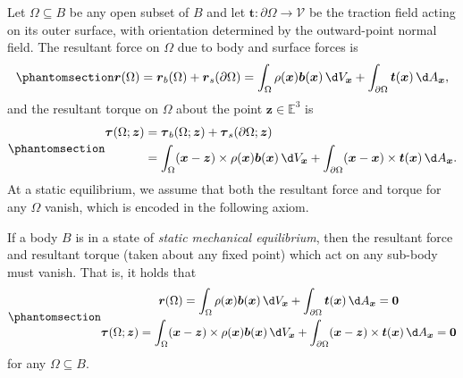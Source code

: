 \documentclass[
  letterpaper,
  DIV=11,
  numbers=noendperiod]{scrreprt}
\theoremstyle{plain}
\theoremstyle{remark}
\begin{document}
Let \(\Omega\subseteq B\) be any open subset of \(B\) and let
\({\boldsymbol{t}}:\partial\Omega\to{\mathcal{V}}\) be the traction
field acting on its outer surface, with orientation determined by the
outward-point normal field. The resultant force on \(\Omega\) due to
body and surface forces is
\begin{equation}\phantomsection\label{eq-resultantforce}{
  {\boldsymbol{r}}(\Omega) = {\boldsymbol{r}}_b(\Omega)+{\boldsymbol{r}}_s(\partial\Omega) = \int_\Omega \rho({\boldsymbol{x}}){\boldsymbol{b}}({\boldsymbol{x}}){\,\d V_{{\boldsymbol{x}}}}+\int_{\partial\Omega}{\boldsymbol{t}}({\boldsymbol{x}}){\,\d A_{{\boldsymbol{x}}}},}\end{equation}
and the resultant torque on \(\Omega\) about the point
\({\boldsymbol{z}}\in{\mathbb{E}}^3\) is
\begin{equation}\phantomsection\label{eq-resultanttorque}{
  \begin{aligned}
    {\boldsymbol{\tau}}(\Omega;{\boldsymbol{z}})
    &= {\boldsymbol{\tau}}_b(\Omega;{\boldsymbol{z}})+{\boldsymbol{\tau}}_s(\partial\Omega;{\boldsymbol{z}})\\
    &=\int_\Omega ({\boldsymbol{x}}-{\boldsymbol{z}})\times\rho({\boldsymbol{x}}){\boldsymbol{b}}({\boldsymbol{x}}){\,\d V_{{\boldsymbol{x}}}}+\int_{\partial \Omega}({\boldsymbol{x}}-{\boldsymbol{x}})\times{\boldsymbol{t}}({\boldsymbol{x}}){\,\d A_{{\boldsymbol{x}}}}.
  \end{aligned}
  }\end{equation} At a static equilibrium, we assume that both the
resultant force and torque for any \(\Omega\) vanish, which is encoded
in the following axiom.

\label{ax:staticequilibrium}{} If a body \(B\) is in a
state of \emph{static mechanical equilibrium}, then the resultant force
and resultant torque (taken about any fixed point) which act on any
sub-body must vanish. That is, it holds that
\begin{equation}\phantomsection\label{eq-equilibriumconditionsINT}{
    \begin{gathered}
      {\boldsymbol{r}}(\Omega)=\int_\Omega \rho({\boldsymbol{x}}){\boldsymbol{b}}({\boldsymbol{x}}){\,\d V_{{\boldsymbol{x}}}}+\int_{\partial\Omega}{\boldsymbol{t}}({\boldsymbol{x}}){\,\d A_{{\boldsymbol{x}}}}=\bf0\\
      {\boldsymbol{\tau}}(\Omega;{\boldsymbol{z}}) = \int_\Omega ({\boldsymbol{x}}-{\boldsymbol{z}})\times\rho({\boldsymbol{x}}){\boldsymbol{b}}({\boldsymbol{x}}){\,\d V_{{\boldsymbol{x}}}}+\int_{\partial \Omega}({\boldsymbol{x}}-{\boldsymbol{z}})\times{\boldsymbol{t}}({\boldsymbol{x}}){\,\d A_{{\boldsymbol{x}}}}=\bf0
    \end{gathered}}\end{equation} for any \(\Omega\subseteq B\).
\end{document}
